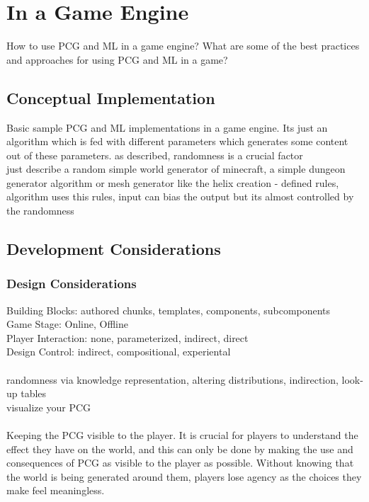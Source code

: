 \documentclass[MGS,Master,english]{twbook}%
\begin{document}
\section{In a Game Engine}
How to use PCG and ML in a game engine? What are some of the best practices and approaches for using PCG and ML in a game?

\subsection{Conceptual Implementation}
Basic sample PCG and ML implementations in a game engine.
Its just an algorithm which is fed with different parameters which generates some content out of these parameters. as described, randomness is a crucial factor\\
just describe a random simple world generator of minecraft, a simple dungeon generator algorithm or mesh generator like the helix creation - defined rules, algorithm uses this rules, input can bias the output but its almost controlled by the randomness


\subsection{Development Considerations}
\subsubsection{Design Considerations}
Building Blocks: authored chunks, templates, components, subcomponents\\
Game Stage: Online, Offline\\
Player Interaction: none, parameterized, indirect, direct\\
Design Control: indirect, compositional, experiental\\
\\
randomness via knowledge representation, altering distributions, indirection, look-up tables\\
visualize your PCG\\
\\
Keeping the PCG visible to the player. It is crucial for players to understand the effect they have on the world, and this can only be done by making the use and consequences of PCG as visible to the player as possible. Without knowing that the world is being generated around them, players lose agency as the choices they make feel meaningless. \cite{pcg::endlessWeb}
\end{document}
